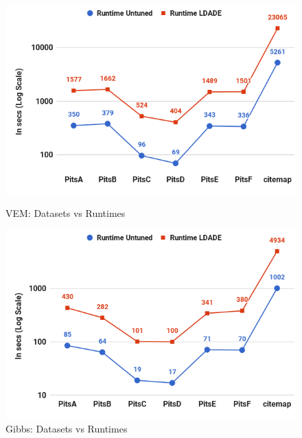 \documentclass[twocolumn,5p,sort&compress]{elsarticle}
\theoremstyle{break}
\begin{document}
\begin{figure}[!t]
    \centering
  \begin{minipage}{.49\textwidth}
        \captionsetup{labelsep=space,justification=centering}
        \includegraphics[width=\linewidth]{./fig/Run_VEM_sci.png}
  \caption{VEM: Datasets vs Runtimes}
  \label{RQ5 VEM}
  \end{minipage}
  \begin{minipage}{.49\textwidth}
        \captionsetup{justification=centering}
        \includegraphics[width=\linewidth]{./fig/Run_gibbs_sci.png}
  \caption{Gibbs: Datasets vs Runtimes}
  \label{RQ5 Gibbs}
    \end{minipage}%
    
\end{figure}
\end{document}
